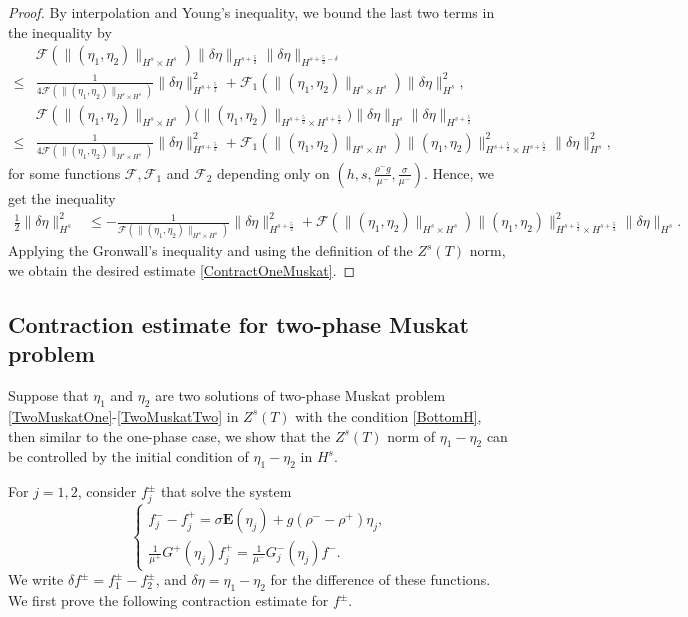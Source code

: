 \documentclass[12pt]{amsart}
\theoremstyle{definition}
\numberwithin{equation}{section}
\newcommand{\f}{\frac}
\begin{document}
\begin{proof}
By interpolation and Young's inequality, we bound the last two terms in the inequality by 
\begin{align*}
&\mathcal{F}(\|(\eta_1, \eta_2)\|_{H^s\times H^s}) \|\delta \eta\|_{H^{s+\f52}} \|\delta \eta\|_{H^{s+\f52-\delta}} \\
\leq& \f{1}{4\mathcal{F}(\|(\eta_1, \eta_2)\|_{H^s\times H^s})} \|\delta \eta \|^2_{H^{s+\f52}} + \mathcal{F}_1(\|(\eta_1, \eta_2)\|_{H^s\times H^s}) \|\delta \eta\|^2_{H^s}, \\
& \mathcal{F}(\|(\eta_1, \eta_2)\|_{H^s\times H^s}) \Big(\|(\eta_1, \eta_2)\|_{H^{s+\f52}\times H^{s+\f52}}\Big)  \|\delta \eta\|_{H^s} \|\delta \eta\|_{H^{s+\f52}} \\
\leq& \f{1}{4\mathcal{F}(\|(\eta_1, \eta_2)\|_{H^s\times H^s})} \|\delta \eta \|^2_{H^{s+\f52}} + \mathcal{F}_1(\|(\eta_1, \eta_2)\|_{H^s\times H^s}) \|(\eta_1, \eta_2)\|_{H^{s+\f52}\times H^{s+\f52}}^2 \|\delta \eta\|^2_{H^s},
\end{align*}
for some functions $\mathcal{F}, \mathcal{F}_1$ and $\mathcal{F}_2$ depending only on $(h,s,\frac{\rho^- g}{\mu^-},\frac{\sigma}{\mu^-})$.
Hence, we get the inequality 
\begin{align*}
\f12 \|\delta \eta \|^2_{H^s} &\leq - \f{1}{\mathcal{F}(\|(\eta_1, \eta_2)\|_{H^s\times H^s})} \|\delta \eta \|^2_{H^{s+\f52}} + \mathcal{F}(\|(\eta_1, \eta_2)\|_{H^s\times H^s}) \|(\eta_1, \eta_2)\|_{H^{s+\f52}\times H^{s+\f52}}^2  \|\delta \eta\|_{H^s}.
\end{align*}
Applying the Gronwall's inequality and using the definition of the $Z^s(T)$ norm, we obtain the desired estimate \eqref{ContractOneMuskat}.
\end{proof}

\subsection{Contraction estimate for two-phase Muskat problem}
Suppose that $\eta_1$ and $\eta_2$ are two solutions of two-phase Muskat problem \eqref{TwoMuskatOne}-\eqref{TwoMuskatTwo} in $Z^s(T)$ with the condition \eqref{BottomH}, then similar to the one-phase case, we show that the $Z^s(T)$ norm of $\eta_1 - \eta_2$ can be controlled by the initial condition of $\eta_1 - \eta_2$ in $H^s$.

For $j = 1,2$, consider $f_j^\pm$ that solve the system 
\begin{equation*} 
\begin{cases}
f^-_j - f^+_j =  \sigma \mathbf{E}(\eta_j) + g(\rho^- - \rho^+)\eta_j, \\
\frac{1}{\mu^+}G^+(\eta_j)f^+_j = \frac{1}{\mu^-}G^-_j(\eta_j)f^-.
\end{cases}
\end{equation*}
We write $\delta f^\pm = f^\pm_1 - f^\pm_2$, and $\delta \eta = \eta_1 - \eta_2$ for the difference of these functions.
We first prove the following contraction estimate for $f^\pm$.
\end{document}

